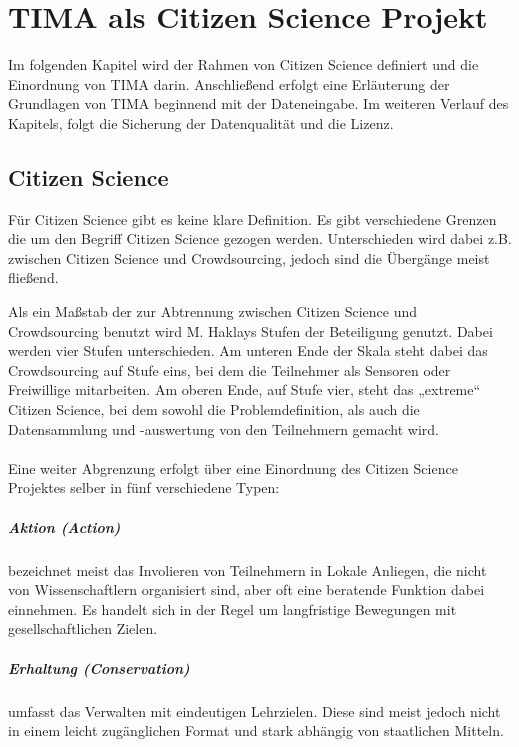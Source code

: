 \chapter{TIMA als Citizen Science Projekt}
Im folgenden Kapitel wird der Rahmen von Citizen Science definiert und die Einordnung von TIMA darin. Anschließend erfolgt eine Erläuterung der Grundlagen von TIMA beginnend mit der Dateneingabe. Im weiteren Verlauf des Kapitels, folgt die Sicherung der Datenqualität und die Lizenz.

\section{Citizen Science}
Für Citizen Science gibt es keine klare Definition. Es gibt verschiedene Grenzen die um den Begriff Citizen Science gezogen werden. Unterschieden wird dabei z.B. zwischen Citizen Science und Crowdsourcing, jedoch sind die Übergänge meist fließend.

Als ein Maßstab der zur Abtrennung zwischen Citizen Science und Crowdsourcing benutzt wird M. Haklays Stufen der Beteiligung genutzt. Dabei werden vier Stufen unterschieden. Am unteren Ende der Skala steht dabei das Crowdsourcing auf Stufe eins, bei dem die Teilnehmer als Sensoren oder Freiwillige mitarbeiten. Am oberen Ende, auf Stufe vier, steht das „extreme“ Citizen Science, bei dem sowohl die Problemdefinition, als auch die Datensammlung und -auswertung von den Teilnehmern gemacht wird.\cite{wiggins2011conservation}
\\~\\
Eine weiter Abgrenzung erfolgt über eine Einordnung des Citizen Science Projektes selber in fünf verschiedene Typen:

\paragraph{Aktion (Action)} bezeichnet meist das Involieren von Teilnehmern in Lokale Anliegen, die nicht von Wissenschaftlern organisiert sind, aber oft eine beratende Funktion dabei einnehmen. Es handelt sich in der Regel um langfristige Bewegungen mit gesellschaftlichen Zielen.

\paragraph{Erhaltung (Conservation)} umfasst das Verwalten mit eindeutigen Lehrzielen. Diese sind meist jedoch nicht in einem leicht zugänglichen Format und stark abhängig von staatlichen Mitteln.

